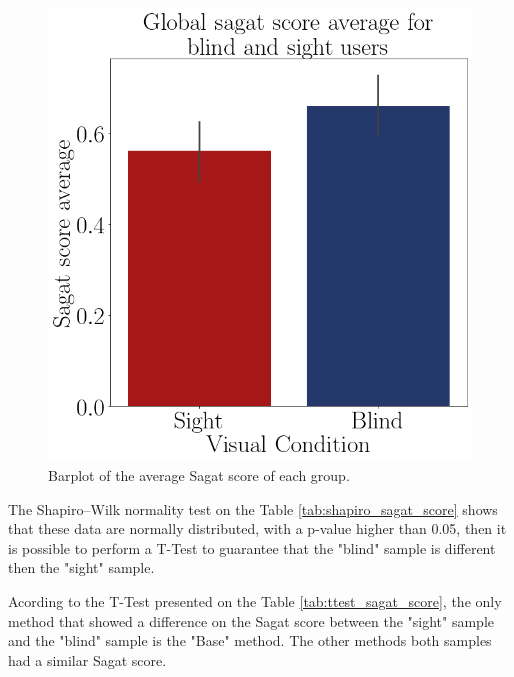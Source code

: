 \begin{figure}[!htb]
\begin{minipage}{.45\linewidth}
        \vspace{1.8cm}
        \centering
        \includegraphics[width = \linewidth]{Resultados/Sagat/Figuras/png/barplot_sagat_avg_global.png}
        \caption{Barplot of the average Sagat score of each group.}
        \label{fig:barplot_sagat}
    \end{minipage}
\end{figure}


The Shapiro–Wilk normality test on the Table \ref{tab:shapiro_sagat_score} shows that these data are normally distributed, with a p-value higher than 0.05, then it is possible to perform a T-Test to guarantee that the "blind" sample is different then the "sight" sample.

%

Acording to the T-Test presented on the Table \ref{tab:ttest_sagat_score}, the only method that showed a difference on the Sagat score between the "sight" sample and the "blind" sample is the "Base" method. The other methods both samples had a similar Sagat score.

